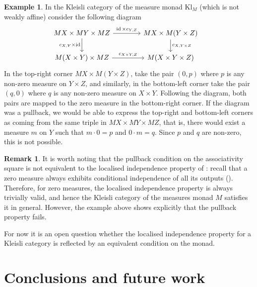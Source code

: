 \documentclass[a4paper,UKenglish,numberwithinsect,cleveref, autoref, thm-restate]{lipics-v2021}
\theoremstyle{plain} %
\theoremstyle{definition} %
\newtheorem{myremark}[mytheorem]{Remark}
\newtheorem{myexample}[mytheorem]{Example}
\begin{document}
\begin{myexample}
 In the Kleisli category of the measure monad $\mathrm{Kl}_M$ (which is not weakly affine) consider the following diagram
 \[
		\hspace{-9pt}	%
		\begin{tikzcd}[column sep=3.3pc]
			MX \times MY \times MZ \ar{r}{\id \times c_{Y,Z}} \ar[swap]{d}{c_{X,Y} \times \id}	& MX \times M(Y \times Z) \ar{d}{c_{X,Y \times Z}}	\\
			M(X \times Y) \times MZ \ar{r}{c_{X\times Y,Z}}						& M(X \times Y \times Z)
		\end{tikzcd}
	\]
	In the top-right corner $MX\times M(Y\times Z)$, take the pair $(0,p)$ where $p$ is any non-zero measure on $Y\times Z$, and similarly, in the bottom-left corner take the pair $(q,0)$ where $q$ is any non-zero measure on $X\times Y$. Following the diagram, both pairs are mapped to the zero measure in the bottom-right corner. If the diagram was a pullback, we would be able to express the top-right and bottom-left corners as coming from the same triple in $MX\times MY\times MZ$, that is, there would exist a measure $m$ on $Y$ such that $m\cdot 0=p$ and $0\cdot m=q$. Since $p$ and $q$ are non-zero, this is not possible.
\end{myexample}
\begin{myremark}
It is worth noting that the pullback condition on the associativity square is not equivalent to the localised independence property of : recall that a zero measure always exhibits conditional independence of all its outputs ().
Therefore, for zero measures, the localised independence property is always trivially valid, and hence the Kleisli category of the measures monad $M$ satisfies it in general.
However, the example above shows explicitly that the pullback property fails.

For now it is an open question whether the localised independence property for a Kleisli category is reflected by an equivalent condition on the monad.
\end{myremark}

\section{Conclusions and future work}
\label{secfurther}
\end{document}
